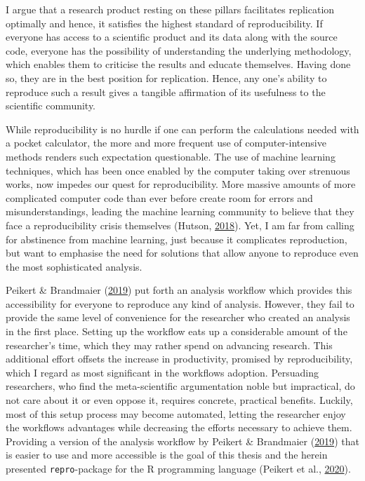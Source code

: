 \documentclass[12pt,a4paper,twoside]{article}
\begin{document}
I argue that a research product resting on these pillars facilitates replication optimally and hence, it satisfies the highest standard of reproducibility.
If everyone has access to a scientific product and its data along with the source code, everyone has the possibility of understanding the underlying methodology, which enables them to criticise the results and educate themselves.
Having done so, they are in the best position for replication.
Hence, any one's ability to reproduce such a result gives a tangible affirmation of its usefulness to the scientific community.

While reproducibility is no hurdle if one can perform the calculations needed with a pocket calculator, the more and more frequent use of computer-intensive methods renders such expectation questionable.
The use of machine learning techniques, which has been once enabled by the computer taking over strenuous works, now impedes our quest for reproducibility.
More massive amounts of more complicated computer code than ever before create room for errors and misunderstandings, leading the machine learning community to believe that they face a reproducibility crisis themselves (Hutson, \protect\hyperlink{ref-hutsonArtificialIntelligenceFaces2018}{2018}).
Yet, I am far from calling for abstinence from machine learning, just because it complicates reproduction, but want to emphasise the need for solutions that allow anyone to reproduce even the most sophisticated analysis.

Peikert \& Brandmaier (\protect\hyperlink{ref-peikertReproducibleDataAnalysis2019}{2019}) put forth an analysis workflow which provides this accessibility for everyone to reproduce any kind of analysis.
However, they fail to provide the same level of convenience for the researcher who created an analysis in the first place.
Setting up the workflow eats up a considerable amount of the researcher's time, which they may rather spend on advancing research.
This additional effort offsets the increase in productivity, promised by reproducibility, which I regard as most significant in the workflows adoption.
Persuading researchers, who find the meta-scientific argumentation noble but impractical, do not care about it or even oppose it, requires concrete, practical benefits.
Luckily, most of this setup process may become automated, letting the researcher enjoy the workflows advantages while decreasing the efforts necessary to achieve them.
Providing a version of the analysis workflow by Peikert \& Brandmaier (\protect\hyperlink{ref-peikertReproducibleDataAnalysis2019}{2019}) that is easier to use and more accessible is the goal of this thesis and the herein presented \texttt{repro}-package for the R programming language (Peikert et al., \protect\hyperlink{ref-R-repro}{2020}).
\end{document}
